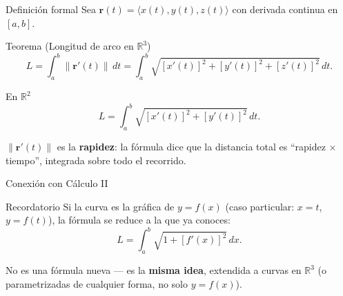 \documentclass[11pt,aspectratio=169]{beamer}
\begin{document}
\begin{frame}{Definición formal}
  Sea $\mathbf r(t)=\langle x(t),y(t),z(t)\rangle$ con derivada continua en $[a,b]$.
  \pause
  \begin{block}{Teorema (Longitud de arco en $\mathbb R^3$)}
    \[
      L = \int_a^b \|\mathbf r'(t)\|\,dt
        = \int_a^b \sqrt{[x'(t)]^2+[y'(t)]^2+[z'(t)]^2}\,dt.
    \]
  \end{block}
  \pause
  \begin{block}{En $\mathbb R^2$}
    \[
      L = \int_a^b \sqrt{[x'(t)]^2+[y'(t)]^2}\,dt.
    \]
  \end{block}
  \pause
  \begin{center}
  \small\color{gray60} $\|\mathbf r'(t)\|$ es la \textbf{rapidez}: la fórmula dice que la distancia total es ``rapidez $\times$ tiempo'', integrada sobre todo el recorrido.
  \end{center}
\end{frame}

\begin{frame}{Conexión con Cálculo II}
  \begin{block}{Recordatorio}
    Si la curva es la gráfica de $y=f(x)$ (caso particular: $x=t$, $y=f(t)$), la fórmula se reduce a la que ya conoces:
    \[
      L=\int_a^b \sqrt{1+[f'(x)]^2}\,dx.
    \]
  \end{block}
  \vspace{6pt}
  \begin{center}
  \normalsize No es una fórmula nueva --- es la \textbf{misma idea}, extendida a curvas en $\mathbb R^3$ (o parametrizadas de cualquier forma, no solo $y=f(x)$).
  \end{center}
\end{frame}
\end{document}
